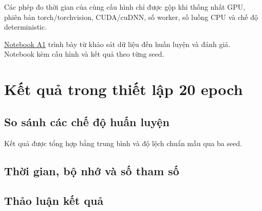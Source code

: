 \documentclass[12pt,a4paper]{report}
\begin{document}
Các phép đo thời gian của cùng cấu hình chỉ được gộp khi thống nhất GPU, phiên bản torch/torchvision, CUDA/cuDNN, số worker, số luồng CPU và chế độ deterministic.

\href{https://github.com/dathuynh1108/CO5085-deep-learning/blob/main/notebooks/A1.ipynb}{Notebook A1}
trình bày từ khảo sát dữ liệu đến huấn luyện và đánh giá. Notebook kèm cấu hình và kết quả theo từng seed.

\chapter{Kết quả trong thiết lập 20 epoch}
\section{So sánh các chế độ huấn luyện}
\begin{table}[htbp]\centering\footnotesize
\setlength{\tabcolsep}{3pt}

\caption{Accuracy và macro-F1 của tám cấu hình, trung bình và SD mẫu qua ba seed. Accuracy theo phần trăm, F1 theo thang 0--1.}
\end{table}
Kết quả được tổng hợp bằng trung bình và độ lệch chuẩn mẫu qua ba seed.

\section{Thời gian, bộ nhớ và số tham số}
\begin{table}[htbp]\centering\small
\setlength{\tabcolsep}{4pt}

\caption{Tổng tham số và tham số được học theo triệu (M). Thời gian huấn luyện đủ 20 epoch và bộ nhớ cấp phát cực đại là trung bình và độ lệch chuẩn mẫu qua ba seed trên RTX 5090.}
\end{table}

\section{Thảo luận kết quả}

\end{document}
